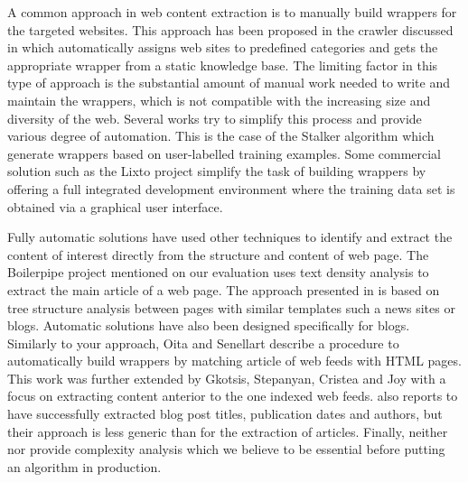 A common approach in web content extraction is to manually build wrappers for the targeted websites. This approach has been proposed in the crawler discussed in \cite{faheem2012intelligent} which automatically assigns web sites to predefined categories and gets the appropriate wrapper from a static knowledge base. The limiting factor in this type of approach is the substantial amount of manual work needed to write and maintain the wrappers, which is not compatible with the increasing size and diversity of the web. Several works try to simplify this process and provide various degree of automation. This is the case of the Stalker algorithm \cite{stalker} which generate wrappers based on user-labelled training examples. Some commercial solution such as the Lixto project \cite{lixto} simplify the task of building wrappers by offering a full integrated development environment where the training data set is obtained via a graphical user interface.

Fully automatic solutions have used other techniques to identify and extract the content of interest directly from the structure and content of web page. The Boilerpipe project \cite{kohlschuetter2010} mentioned on our evaluation uses text density analysis to extract the main article of a web page. The approach presented in \cite{treeedit} is based on tree structure analysis between pages with similar templates such a news sites or blogs. Automatic solutions have also been designed specifically for blogs. Similarly to your approach, Oita and Senellart \cite{oita2010} describe a procedure to automatically build wrappers by matching article of web feeds with HTML pages. This work was further extended by Gkotsis, Stepanyan, Cristea and Joy \cite{gkotsis2013} with a focus on extracting content anterior to the one indexed web feeds. \cite{gkotsis2013} also reports to have successfully extracted blog post titles, publication dates and authors, but their approach is less generic than for the extraction of articles. Finally, neither \cite{oita2010} nor \cite{gkotsis2013} provide complexity analysis which we believe to be essential before putting an algorithm in production.

